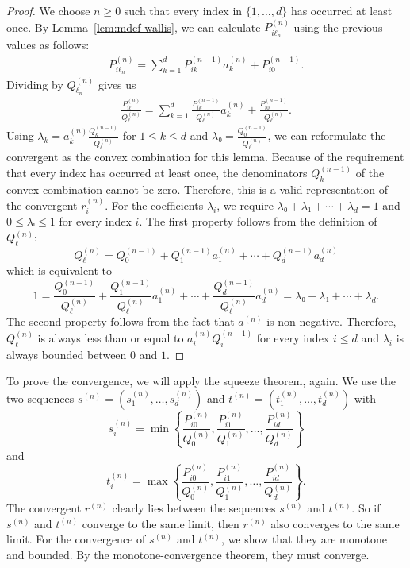 \begin{proof}
  We choose $n ≥ 0$ such that every index in $\{1, …, d\}$ has occurred at least once.
  By Lemma~\ref{lem:mdcf-wallis}, we can calculate $P_{iℓ_n}^{(n)}$ using the previous values as follows:
  \begin{align*}
    P_{iℓ_n}^{(n)} = \sum_{k = 1}^d P_{ik}^{(n-1)} a_k^{(n)} + P_{i0}^{(n-1)}.
  \end{align*}
  Dividing by $Q_{ℓ_n}^{(n)}$ gives us
  \begin{align*}
    \frac{P_{iℓ}^{(n)}}{Q_{ℓ}^{(n)}} = \sum_{k = 1}^d \frac{P_{ik}^{(n-1)}}{Q_ℓ^{(n)}} a_k^{(n)} + \frac{P_{i0}^{(n-1)}}{Q_ℓ^{(n)}}.
  \end{align*}
  Using $λ_k = a_k^{(n)} \frac{Q_k^{(n-1)}}{Q_ℓ^{(n)}}$ for $1 ≤ k ≤ d$ and $λ₀ = \frac{Q_0^{(n-1)}}{Q_ℓ^{(n)}}$,
  we can reformulate the convergent as the convex combination for this lemma.
  Because of the requirement that every index has occurred at least once,
  the denominators $Q_k^{(n-1)}$ of the convex combination cannot be zero.
  Therefore, this is a valid representation of the convergent $r_i^{(n)}$.
  For the coefficients $λ_i$, we require $λ₀ + λ₁ + ⋯ + λ_d = 1$ and $0 ≤ λᵢ ≤ 1$ for every index $i$.
  The first property follows from the definition of $Q_ℓ^{(n)}$:
  \[
    Q_ℓ^{(n)} = Q_0^{(n-1)} + Q_1^{(n-1)} a_1^{(n)} + ⋯ + Q_d^{(n-1)} a_d^{(n)}
  \]
  which is equivalent to
  \[
    1 = \frac{Q_0^{(n-1)}}{Q_ℓ^{(n)}} + \frac{Q_1^{(n-1)}}{Q_ℓ^{(n)}} a_1^{(n)} + ⋯ + \frac{Q_d^{(n-1)}}{Q_ℓ^{(n)}} a_d^{(n)} = λ₀ + λ₁ + ⋯ + λ_d.
  \]
  The second property follows from the fact that $a^{(n)}$ is non-negative.
  Therefore, $Q_ℓ^{(n)}$ is always less than or equal to $a_i^{(n)}
  Q_i^{(n-1)}$ for every index $i ≤ d$ and $λ_i$ is always bounded
  between $0$ and $1$.
\end{proof}

To prove the convergence, we will apply the squeeze theorem, again.
We use the two sequences $s^{(n)} = (s_1^{(n)}, …, s_d^{(n)})$ and $t^{(n)} = (t_1^{(n)}, …, t_d^{(n)})$ with
\[
  s_i^{(n)} = \min\left\{\frac{P_{i0}^{(n)}}{Q_0^{(n)}}, \frac{P_{i1}^{(n)}}{Q_1^{(n)}}, …, \frac{P_{id}^{(n)}}{Q_d^{(n)}}\right\}
\]
and
\[
  t_i^{(n)} = \max\left\{\frac{P_{i0}^{(n)}}{Q_0^{(n)}}, \frac{P_{i1}^{(n)}}{Q_1^{(n)}}, …, \frac{P_{id}^{(n)}}{Q_d^{(n)}}\right\}.
\]
The convergent $r^{(n)}$ clearly lies between the sequences $s^{(n)}$ and $t^{(n)}$.
So if $s^{(n)}$ and $t^{(n)}$ converge to the same limit, then $r^{(n)}$ also
converges to the same limit.
For the convergence of $s^{(n)}$ and $t^{(n)}$, we show that they are monotone
and bounded.
By the monotone-convergence theorem, they must converge.

